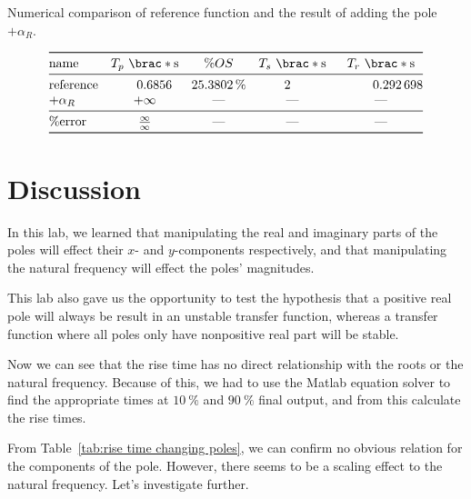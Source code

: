 \documentclass[12pt]{article}
\DeclarePairedDelimiter\brac[]%
\begin{document}
\begin{table}[]
    \centering
    \caption{Numerical comparison of reference function and the result of adding the pole $+\alpha_R$.}
    \[
        \begin{array}{@{}>$l<$SSSS@{}}
        \toprule
            name &
            T_p\ \brac*{\si\second}
                & \%OS
                & T_s\ \brac*{\si\second}
                & T_r\ \brac*{\si\second}
        \\*
        \midrule
            reference &
            0.6856 & \SI{25.3802}\percent & 2 & 0.292698
        \\*
            $+\alpha_R$ &
            \text{$+\infty$} & \text{---} & \text{---} & \text{---}
        \\*
        \midrule
            \%error &
            \frac\infty\infty
                & \text{---}
                & \text{---}
                & \text{---}
        \\*
        \bottomrule
        \end{array}
    \]
    \label{tab:positive real poles}
\end{table}

\section{Discussion}

In this lab, we learned that manipulating the real and imaginary parts of the poles will effect their $x$- and $y$-components respectively, and that manipulating the natural frequency will effect the poles' magnitudes.

This lab also gave us the opportunity to test the hypothesis that a positive real pole will always be result in an unstable transfer function, whereas a transfer function where all poles only have nonpositive real part will be stable.

Now we can see that the rise time has no direct relationship with the roots or the natural frequency.
Because of this, we had to use the Matlab equation solver to find the appropriate times at $\SI{10}\percent$ and $\SI{90}\percent$ final output,
and from this calculate the rise times.

From Table~\ref{tab:rise time changing poles}, we can confirm no obvious relation for the components of the pole. However, there seems to be a scaling effect to the natural frequency. Let's investigate further.



\newpage
\printbibliography
\end{document}
